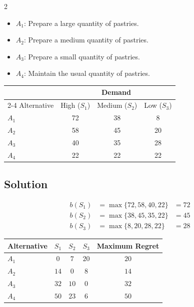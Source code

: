 \begin{multicols}{2}
		\begin{itemize}
			\item $A_1$: Prepare a large quantity of pastries.
			\item $A_2$: Prepare a medium quantity of pastries.
			\item $A_3$: Prepare a small quantity of pastries.
			\item $A_4$: Maintain the usual quantity of pastries.
		\end{itemize}
		
		\begin{center}
			\renewcommand{\arraystretch}{1.3}
			\small
			\begin{tabular}{lccc}
				\toprule
				& \multicolumn{3}{c}{Demand} \\
				\cmidrule(lr){2-4}
				Alternative & High ($S_1$) & Medium ($S_2$) & Low ($S_3$) \\
				\midrule
				$A_1$ & 72 & 38 & 8 \\
				$A_2$ & 58 & 45 & 20 \\
				$A_3$ & 40 & 35 & 28 \\
				$A_4$ & 22 & 22 & 22 \\
				\bottomrule
			\end{tabular}
		\end{center}
		
		\subsection*{Solution}
		
		\[
		\begin{array}{lll}
			b(S_1) &= \max\{72,58,40,22\} &= 72 \\[3pt]
			b(S_2) &= \max\{38,45,35,22\} &= 45 \\[3pt]
			b(S_3) &= \max\{8,20,28,22\} &= 28
		\end{array}
		\]
		
		\begin{center}
			\renewcommand{\arraystretch}{1.5}
			\small
			\begin{tabular}{lcccc}
				\toprule
				Alternative & $S_1$ & $S_2$ & $S_3$ & Maximum Regret \\
				\midrule
				$A_1$ & $0$ & $7$ & $20$ & $20$ \\
				$A_2$ & $14$ & $0$ & $8$ & $14$ \\
				$A_3$ & $32$ & $10$ & $0$ & $32$ \\
				$A_4$ & $50$ & $23$ & $6$ & $50$ \\
				\bottomrule
			\end{tabular}
		\end{center}
		

\end{multicols}
